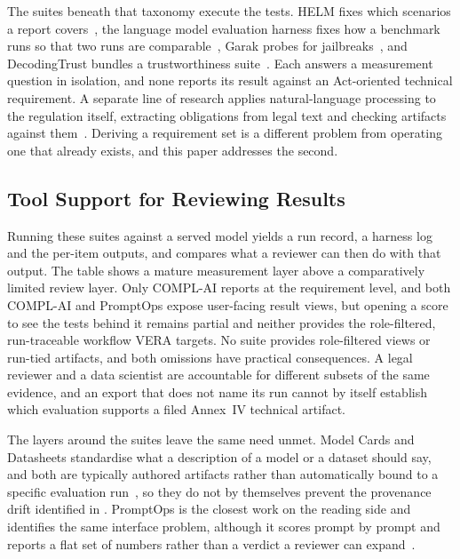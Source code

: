 \documentclass[10pt,conference]{IEEEtran}
\begin{document}
The suites beneath that taxonomy execute the tests.
HELM fixes which scenarios a report covers~\cite{liang2023helm}, the language model evaluation harness fixes how a benchmark runs so that two runs are comparable~\cite{gao2021lmevalharness}, Garak probes for jailbreaks~\cite{derczynski2024garak}, and DecodingTrust bundles a trustworthiness suite~\cite{wang2023decodingtrust}.
Each answers a measurement question in isolation, and none reports its result against an Act-oriented technical requirement.
A separate line of research applies natural-language processing to the regulation itself, extracting obligations from legal text and checking artifacts against them~\cite{abualhaija2025llmregextraction,amaral2022nlpcompliance,abualhaija2024regchange}.
Deriving a requirement set is a different problem from operating one that already exists, and this paper addresses the second.

\subsection{Tool Support for Reviewing Results}
Running these suites against a served model yields a run record, a harness log and the per-item outputs, and  compares what a reviewer can then do with that output.
The table shows a mature measurement layer above a comparatively limited review layer.
Only COMPL-AI reports at the requirement level, and both COMPL-AI and PromptOps expose user-facing result views, but opening a score to see the tests behind it remains partial and neither provides the role-filtered, run-traceable workflow VERA targets.
No suite provides role-filtered views or run-tied artifacts, and both omissions have practical consequences.
A legal reviewer and a data scientist are accountable for different subsets of the same evidence, and an export that does not name its run cannot by itself establish which evaluation supports a filed Annex~IV technical artifact.

The layers around the suites leave the same need unmet.
Model Cards and Datasheets standardise what a description of a model or a dataset should say, and both are typically authored artifacts rather than automatically bound to a specific evaluation run~\cite{mitchell2019modelcard,gebru2021datasheets}, so they do not by themselves prevent the provenance drift identified in .
PromptOps is the closest work on the reading side and identifies the same interface problem, although it scores prompt by prompt and reports a flat set of numbers rather than a verdict a reviewer can expand~\cite{sunetnanta2025promptops}.
\end{document}
